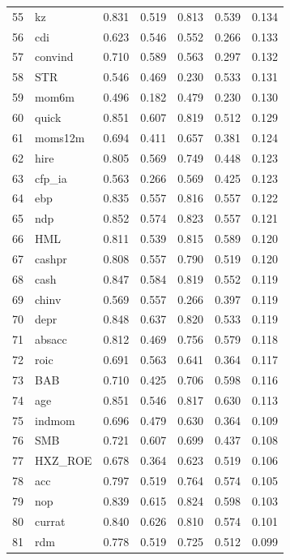 \begin{footnotesize}
\begin{longtable}{rl|c|c|c|c|c}
		55 & kz & 0.831 & 0.519 & 0.813 & 0.539 & 0.134 \\ 
		56 & cdi & 0.623 & 0.546 & 0.552 & 0.266 & 0.133 \\ 
		57 & convind & 0.710 & 0.589 & 0.563 & 0.297 & 0.132 \\ 
		58 & STR & 0.546 & 0.469 & 0.230 & 0.533 & 0.131 \\ 
		59 & mom6m & 0.496 & 0.182 & 0.479 & 0.230 & 0.130 \\ 
		60 & quick & 0.851 & 0.607 & 0.819 & 0.512 & 0.129 \\ 
		61 & moms12m & 0.694 & 0.411 & 0.657 & 0.381 & 0.124 \\ 
		62 & hire & 0.805 & 0.569 & 0.749 & 0.448 & 0.123 \\ 
		63 & cfp\_ia & 0.563 & 0.266 & 0.569 & 0.425 & 0.123 \\ 
		64 & ebp & 0.835 & 0.557 & 0.816 & 0.557 & 0.122 \\ 
		65 & ndp & 0.852 & 0.574 & 0.823 & 0.557 & 0.121 \\ 
		66 & HML & 0.811 & 0.539 & 0.815 & 0.589 & 0.120 \\ 
		67 & cashpr & 0.808 & 0.557 & 0.790 & 0.519 & 0.120 \\ 
		68 & cash & 0.847 & 0.584 & 0.819 & 0.552 & 0.119 \\ 
		69 & chinv & 0.569 & 0.557 & 0.266 & 0.397 & 0.119 \\ 
		70 & depr & 0.848 & 0.637 & 0.820 & 0.533 & 0.119 \\ 
		71 & absacc & 0.812 & 0.469 & 0.756 & 0.579 & 0.118 \\ 
		72 & roic & 0.691 & 0.563 & 0.641 & 0.364 & 0.117 \\ 
		73 & BAB & 0.710 & 0.425 & 0.706 & 0.598 & 0.116 \\ 
		74 & age & 0.851 & 0.546 & 0.817 & 0.630 & 0.113 \\ 
		75 & indmom & 0.696 & 0.479 & 0.630 & 0.364 & 0.109 \\ 
		76 & SMB & 0.721 & 0.607 & 0.699 & 0.437 & 0.108 \\ 
		77 & HXZ\_ROE & 0.678 & 0.364 & 0.623 & 0.519 & 0.106 \\ 
		78 & acc & 0.797 & 0.519 & 0.764 & 0.574 & 0.105 \\ 
		79 & nop & 0.839 & 0.615 & 0.824 & 0.598 & 0.103 \\ 
		80 & currat & 0.840 & 0.626 & 0.810 & 0.574 & 0.101 \\ 
		81 & rdm & 0.778 & 0.519 & 0.725 & 0.512 & 0.099 \\ 

\end{longtable}
\end{footnotesize}
